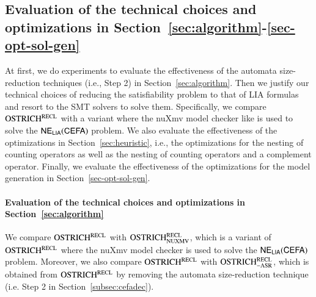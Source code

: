 
\subsection{Evaluation of the technical choices and optimizations in Section~\ref{sec:algorithm}-\ref{sec-opt-sol-gen}}\label{subsec:size_reduction_eval}

At first, we do experiments to evaluate the effectiveness of the automata size-reduction techniques (i.e., Step 2) in Section~\ref{sec:algorithm}. Then we justify our technical choices of reducing the satisfiability problem to that of LIA formulas and resort to the SMT solvers to solve them. Specifically, we compare $\rm OSTRICH^{RECL}$ with a variant where the nuXmv model checker like \cite{atva2020} is used to solve the ${\sf NE_{LIA}(CEFA)}$ problem. 
%
We also evaluate the effectiveness of the optimizations in Section~\ref{sec:heuristic}, i.e., the optimizations for the nesting of counting operators as well as the nesting of counting operators and a complement operator. Finally, we evaluate the effectiveness of the optimizations for the model generation in Section~\ref{sec-opt-sol-gen}. 


\paragraph*{Evaluation of the technical choices and optimizations in Section~\ref{sec:algorithm}}
%
We compare $\rm OSTRICH^{RECL}$ with $\rm OSTRICH^{RECL}_{\rm NUXMV}$, which is a variant of $\rm OSTRICH^{RECL}$ where the nuXmv model checker is used to solve the ${\sf NE_{LIA}(CEFA)}$ problem. Moreover, we also compare $\rm OSTRICH^{RECL}$ with $\rm OSTRICH^{RECL}_{\rm -ASR}$, which is obtained from $\rm OSTRICH^{RECL}$ by removing the automata size-reduction technique (i.e. Step 2 in Section~\ref{subsec:cefadec}). 

